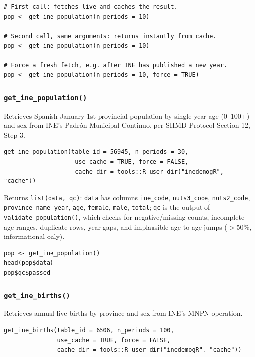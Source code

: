 \documentclass[11pt]{article}
\newcommand{\fn}[1]{\texttt{#1}}
\begin{document}
\begin{lstlisting}
# First call: fetches live and caches the result.
pop <- get_ine_population(n_periods = 10)

# Second call, same arguments: returns instantly from cache.
pop <- get_ine_population(n_periods = 10)

# Force a fresh fetch, e.g. after INE has published a new year.
pop <- get_ine_population(n_periods = 10, force = TRUE)
\end{lstlisting}

\subsubsection{\fn{get\_ine\_population()}}

Retrieves Spanish January-1st provincial population by single-year age
(0--100+) and sex from INE's Padr\'{o}n Municipal Continuo, per SHMD
Protocol Section 12, Step 3.

\begin{lstlisting}
get_ine_population(table_id = 56945, n_periods = 30,
                    use_cache = TRUE, force = FALSE,
                    cache_dir = tools::R_user_dir("inedemogR", "cache"))
\end{lstlisting}

Returns \fn{list(data, qc)}: \fn{data} has columns \fn{ine\_code},
\fn{nuts3\_code}, \fn{nuts2\_code}, \fn{province\_name}, \fn{year},
\fn{age}, \fn{female}, \fn{male}, \fn{total}; \fn{qc} is the output of
\fn{validate\_population()}, which checks for negative/missing counts,
incomplete age ranges, duplicate rows, year gaps, and implausible
age-to-age jumps ($>$50\%, informational only).

\begin{lstlisting}
pop <- get_ine_population()
head(pop$data)
pop$qc$passed
\end{lstlisting}

\subsubsection{\fn{get\_ine\_births()}}

Retrieves annual live births by province and sex from INE's MNPN operation.

\begin{lstlisting}
get_ine_births(table_id = 6506, n_periods = 100,
               use_cache = TRUE, force = FALSE,
               cache_dir = tools::R_user_dir("inedemogR", "cache"))
\end{lstlisting}
\end{document}

